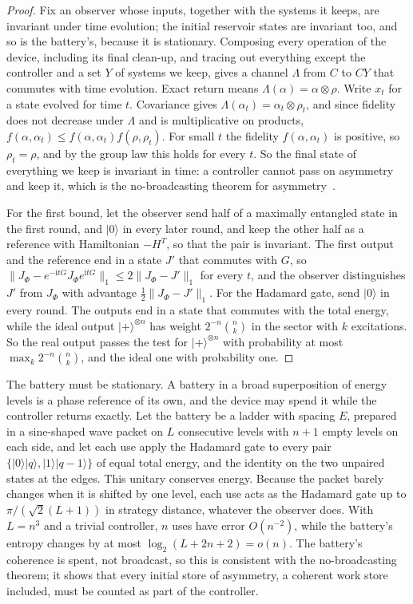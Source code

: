 \documentclass[11pt]{article}
\theoremstyle{definition}
\theoremstyle{remark}
\begin{document}
\begin{proof}
Fix an observer whose inputs, together with the systems it keeps, are invariant under time evolution; the initial reservoir states are invariant too, and so is the battery's, because it is stationary. Composing every operation of the device, including its final clean-up, and tracing out everything except the controller and a set $Y$ of systems we keep, gives a channel $\Lambda$ from $C$ to $CY$ that commutes with time evolution. Exact return means $\Lambda(\alpha)=\alpha\otimes\rho$. Write $x_t$ for a state evolved for time $t$. Covariance gives $\Lambda(\alpha_t)=\alpha_t\otimes\rho_t$, and since fidelity does not decrease under $\Lambda$ and is multiplicative on products, $f(\alpha,\alpha_t)\le f(\alpha,\alpha_t)f(\rho,\rho_t)$. For small $t$ the fidelity $f(\alpha,\alpha_t)$ is positive, so $\rho_t=\rho$, and by the group law this holds for every $t$. So the final state of everything we keep is invariant in time: a controller cannot pass on asymmetry and keep it, which is the no-broadcasting theorem for asymmetry~\cite{MarvianSpekkens19,LostaglioMuller19}.

For the first bound, let the observer send half of a maximally entangled state in the first round, and $|0\rangle$ in every later round, and keep the other half as a reference with Hamiltonian $-H^T$, so that the pair is invariant. The first output and the reference end in a state $J'$ that commutes with $G$, so $\|J_\Phi-e^{-\mathrm itG}J_\Phi e^{\mathrm itG}\|_1\le2\|J_\Phi-J'\|_1$ for every $t$, and the observer distinguishes $J'$ from $J_\Phi$ with advantage $\tfrac12\|J_\Phi-J'\|_1$. For the Hadamard gate, send $|0\rangle$ in every round. The outputs end in a state that commutes with the total energy, while the ideal output $|+\rangle^{\otimes n}$ has weight $2^{-n}\binom nk$ in the sector with $k$ excitations. So the real output passes the test for $|+\rangle^{\otimes n}$ with probability at most $\max_k2^{-n}\binom nk$, and the ideal one with probability one.
\end{proof}

The battery must be stationary. A battery in a broad superposition of energy levels is a phase reference of its own, and the device may spend it while the controller returns exactly. Let the battery be a ladder with spacing $E$, prepared in a sine-shaped wave packet on $L$ consecutive levels with $n+1$ empty levels on each side, and let each use apply the Hadamard gate to every pair $\{|0\rangle|q\rangle,|1\rangle|q-1\rangle\}$ of equal total energy, and the identity on the two unpaired states at the edges. This unitary conserves energy. Because the packet barely changes when it is shifted by one level, each use acts as the Hadamard gate up to $\pi/(\sqrt2(L+1))$ in strategy distance, whatever the observer does. With $L=n^3$ and a trivial controller, $n$ uses have error $O(n^{-2})$, while the battery's entropy changes by at most $\log_2(L+2n+2)=o(n)$. The battery's coherence is spent, not broadcast, so this is consistent with the no-broadcasting theorem; it shows that every initial store of asymmetry, a coherent work store included, must be counted as part of the controller.
\end{document}
